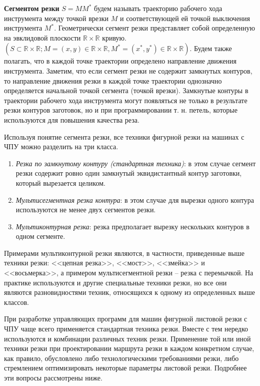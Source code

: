 \begin{opred}
\label{def:cutting-segment}
{\bf Сегментом резки}
$S=MM^*$
будем называть траекторию рабочего хода
инструмента между точкой врезки
$M$
и соответствующей ей точкой выключения инструмента
$M^*$.
Геометрически сегмент резки представляет собой
определенную на эвклидовой плоскости
$\mathbb R \times \mathbb R$
кривую.
$(S \subset \mathbb R \times \mathbb R;
M=(x,y) \in \mathbb R \times \mathbb R,
M^* =(x^*,y^*)\in \mathbb R \times \mathbb R)$.
Будем также полагать,
что в каждой точке траектории определено направление движения инструмента.
Заметим, что если сегмент резки не содержит замкнутых контуров,
то направление движения резки в каждой точке траектории
однозначно определяется начальной точкой сегмента
(точкой врезки).
Замкнутые контуры в траектории рабочего хода инструмента
могут появляться не только в результате резки контуров заготовок,
но и при программировании т. н. петель,
которые используются для повышения качества реза.
\end{opred}

Используя понятие сегмента резки,
все техники фигурной резки на машинах с ЧПУ
можно разделить на три класса.
\begin{enumerate}
  \item
  {\it Резка по замкнутому контуру (стандартная техника)}:
  в этом случае сегмент резки содержит
  ровно один замкнутый эквидистантный контур заготовки,
  который вырезается целиком.
  \item
  {\it Мультисегментная резка контура}:
  в этом случае для вырезки одного контура
  используются не менее двух сегментов резки.
  \item
  {\it Мультиконтурная резка}:
  резка предполагает вырезку нескольких
  контуров в одном сегменте.
\end{enumerate}

Примерами мультиконтурной резки являются,
в частности, приведенные выше техники резки:
<<цепная резка>>, <<мост>>, <<змейка>> и <<восьмерка>>,
а примером мультисегментной резки --
резка с перемычкой.
На практике используются и другие специальные техники резки,
но все они являются разновидностями техник,
относящихся к одному из определенных выше классов.

При разработке управляющих программ для
машин фигурной листовой резки с ЧПУ чаще всего
применяется стандартная техника резки.
Вместе с тем нередко используются и
комбинации различных техник резки.
Применение той или иной техники резки
при проектировании маршрута резки в
каждом конкретном случае, как правило,
обусловлено либо технологическими требованиями резки,
либо стремлением оптимизировать некоторые
параметры листовой резки.
Подробнее эти вопросы рассмотрены ниже.
